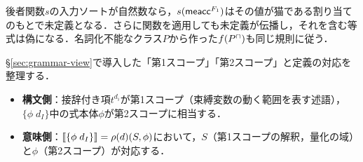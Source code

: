 \documentclass[../../main-detail.tex]{subfiles}
\begin{document}
\begin{example}
    後者関数$s$の入力ソートが自然数なら，$s(\textsf{meacc}^{F_1})$はその値が猫である割り当てのもとで未定義となる．さらに関数を適用しても未定義が伝播し，それを含む等式は偽になる．名詞化不能なクラス$P$から作った$f({{P}^\cap})$も同じ規則に従う．
\end{example}
\begin{remark}
    §\ref{sec:grammar-view}で導入した「第1スコープ」「第2スコープ」と定義の対応を整理する．
    \begin{itemize}
        \item \textbf{構文側}：接辞付き項$t^{d_i}$が第1スコープ（束縛変数の動く範囲を表す述語），$\{\phi\; d_I\}$中の式本体$\phi$が第2スコープに相当する．
        \item \textbf{意味側}：$\llbracket\{\phi\; d_I\}\rrbracket = \rho(d)(S, \phi)$において，$S$（第1スコープの解釈，量化の域）と$\phi$（第2スコープ）が対応する．
    \end{itemize}
\end{remark}
\end{document}

